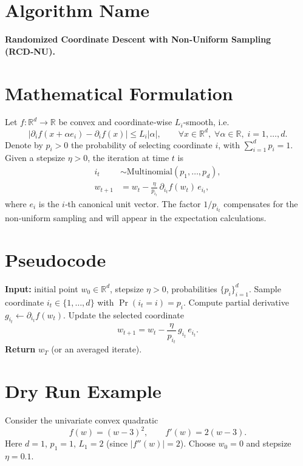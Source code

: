 \documentclass{article}
\begin{document}
\section*{Algorithm Name}
\textbf{Randomized Coordinate Descent with Non‑Uniform Sampling (RCD‑NU).}

\section*{Mathematical Formulation}
Let $f:\mathbb{R}^{d}\rightarrow\mathbb{R}$ be convex and coordinate‑wise $L_i$‑smooth, i.e.
\[
\bigl|\partial_i f(x+\alpha e_i)-\partial_i f(x)\bigr|\le L_i|\alpha|,
\qquad\forall x\in\mathbb{R}^d,\;\forall\alpha\in\mathbb{R},\; i=1,\dots,d .
\tag{1}
\]
Denote by $p_i>0$ the probability of selecting coordinate $i$, with $\sum_{i=1}^{d}p_i=1$.
Given a stepsize $\eta>0$, the iteration at time $t$ is
\[
\boxed{
\begin{aligned}
i_t &\sim \text{Multinomial}(p_1,\dots,p_d),\\
w_{t+1}&=w_t-\frac{\eta}{p_{i_t}}\,\partial_{i_t}f(w_t)\,e_{i_t},
\end{aligned}}
\tag{2}
\]
where $e_i$ is the $i$‑th canonical unit vector.  
The factor $1/p_{i_t}$ compensates for the non‑uniform sampling and will appear in the expectation calculations.

\section*{Pseudocode}
\begin{algorithm}[H]
\caption{RCD‑NU}
\begin{algorithmic}[1]
\STATE \textbf{Input:} initial point $w_0\in\mathbb{R}^d$, stepsize $\eta>0$, probabilities $\{p_i\}_{i=1}^d$.
    \STATE Sample coordinate $i_t\in\{1,\dots,d\}$ with $\Pr(i_t=i)=p_i$.
    \STATE Compute partial derivative $g_{i_t}\gets\partial_{i_t}f(w_t)$.
    \STATE Update the selected coordinate
    \[
    w_{t+1}=w_t-\frac{\eta}{p_{i_t}}\,g_{i_t}\,e_{i_t}.
    \]
\ENDFOR
\STATE \textbf{Return} $w_T$ (or an averaged iterate).
\end{algorithmic}
\end{algorithm}

\section*{Dry Run Example}
Consider the univariate convex quadratic
\[
f(w)=(w-3)^2,\qquad f'(w)=2(w-3).
\]
Here $d=1$, $p_1=1$, $L_1=2$ (since $|f''(w)|=2$).  
Choose $w_0=0$ and stepsize $\eta=0.1$.
\end{document}
